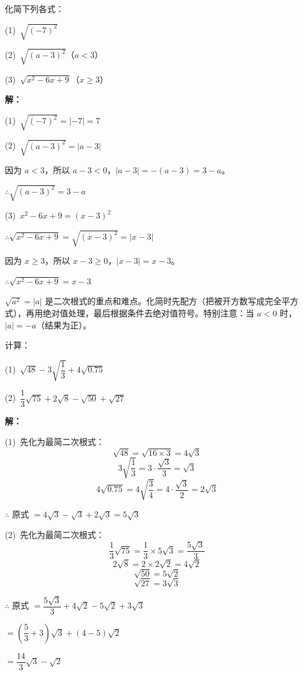 \documentclass[12pt, a4paper]{ctexart}
\begin{document}
\begin{examplebox}
化简下列各式：

\medskip
(1)\ $\sqrt{(-7)^2}$

\medskip
(2)\ $\sqrt{(a-3)^2}$（$a < 3$）

\medskip
(3)\ $\sqrt{x^2 - 6x + 9}$（$x \geqslant 3$）

\bigskip
\textbf{解：}

(1)\ $\sqrt{(-7)^2} = |-7| = 7$

\medskip
(2)\ $\sqrt{(a-3)^2} = |a - 3|$

因为 $a < 3$，所以 $a - 3 < 0$，$|a - 3| = -(a-3) = 3 - a$。

$\therefore \sqrt{(a-3)^2} = 3 - a$

\medskip
(3)\ $x^2 - 6x + 9 = (x-3)^2$

$\therefore \sqrt{x^2 - 6x + 9} = \sqrt{(x-3)^2} = |x-3|$

因为 $x \geqslant 3$，所以 $x - 3 \geqslant 0$，$|x - 3| = x - 3$。

$\therefore \sqrt{x^2 - 6x + 9} = x - 3$
\end{examplebox}

\begin{tipbox}[方法总结]
$\sqrt{a^2} = |a|$ 是二次根式的重点和难点。化简时先配方（把被开方数写成完全平方式），再用绝对值处理，最后根据条件去绝对值符号。特别注意：当 $a < 0$ 时，$|a| = -a$（结果为正）。
\end{tipbox}

\begin{examplebox}[【例题3】二次根式的加减运算]
计算：

\medskip
(1)\ $\sqrt{48} - 3\sqrt{\dfrac{1}{3}} + 4\sqrt{0.75}$

\medskip
(2)\ $\dfrac{1}{3}\sqrt{75} + 2\sqrt{8} - \sqrt{50} + \sqrt{27}$

\bigskip
\textbf{解：}

(1)\ 先化为最简二次根式：
\[
\sqrt{48} = \sqrt{16 \times 3} = 4\sqrt{3}
\]
\[
3\sqrt{\frac{1}{3}} = 3 \cdot \frac{\sqrt{3}}{3} = \sqrt{3}
\]
\[
4\sqrt{0.75} = 4\sqrt{\frac{3}{4}} = 4 \cdot \frac{\sqrt{3}}{2} = 2\sqrt{3}
\]

$\therefore$ 原式 $= 4\sqrt{3} - \sqrt{3} + 2\sqrt{3} = 5\sqrt{3}$

\medskip
(2)\ 先化为最简二次根式：
\[
\frac{1}{3}\sqrt{75} = \frac{1}{3} \times 5\sqrt{3} = \frac{5\sqrt{3}}{3}
\]
\[
2\sqrt{8} = 2 \times 2\sqrt{2} = 4\sqrt{2}
\]
\[
\sqrt{50} = 5\sqrt{2}
\]
\[
\sqrt{27} = 3\sqrt{3}
\]

$\therefore$ 原式 $= \dfrac{5\sqrt{3}}{3} + 4\sqrt{2} - 5\sqrt{2} + 3\sqrt{3}$

$= \left(\dfrac{5}{3} + 3\right)\sqrt{3} + (4 - 5)\sqrt{2}$

$= \dfrac{14}{3}\sqrt{3} - \sqrt{2}$
\end{examplebox}
\end{document}
